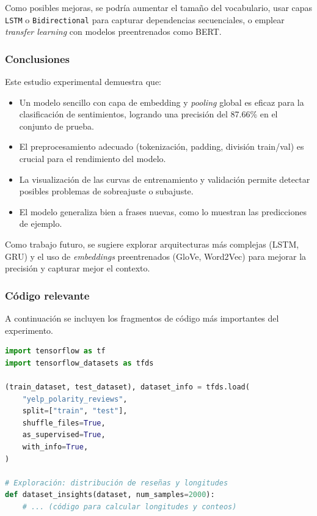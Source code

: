 \documentclass[12pt]{article}
\begin{document}
Como posibles mejoras, se podría aumentar el tamaño del vocabulario, usar capas \texttt{LSTM} o \texttt{Bidirectional} para capturar dependencias secuenciales, o emplear \textit{transfer learning} con modelos preentrenados como BERT.

\subsubsection*{Conclusiones}

Este estudio experimental demuestra que:

\begin{itemize}
    \item Un modelo sencillo con capa de embedding y \textit{pooling} global es eficaz para la clasificación de sentimientos, logrando una precisión del 87.66\% en el conjunto de prueba.
    \item El preprocesamiento adecuado (tokenización, padding, división train/val) es crucial para el rendimiento del modelo.
    \item La visualización de las curvas de entrenamiento y validación permite detectar posibles problemas de sobreajuste o subajuste.
    \item El modelo generaliza bien a frases nuevas, como lo muestran las predicciones de ejemplo.
\end{itemize}

Como trabajo futuro, se sugiere explorar arquitecturas más complejas (LSTM, GRU) y el uso de \textit{embeddings} preentrenados (GloVe, Word2Vec) para mejorar la precisión y capturar mejor el contexto.

\subsubsection*{Código relevante}

A continuación se incluyen los fragmentos de código más importantes del experimento.

\begin{lstlisting}[language=Python, caption=Carga y exploración del dataset., label=lst:carga_yelp]
import tensorflow as tf
import tensorflow_datasets as tfds

(train_dataset, test_dataset), dataset_info = tfds.load(
    "yelp_polarity_reviews",
    split=["train", "test"],
    shuffle_files=True,
    as_supervised=True,
    with_info=True,
)

# Exploración: distribución de reseñas y longitudes
def dataset_insights(dataset, num_samples=2000):
    # ... (código para calcular longitudes y conteos)
\end{lstlisting}
\end{document}
